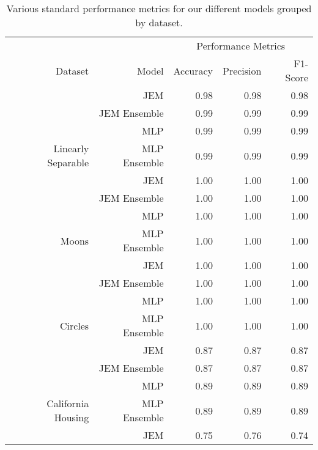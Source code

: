 \begin{table}

\caption{Various standard performance metrics for our different models grouped by dataset. \label{tab:perf} \newline}
\centering
\fontsize{8}{10}\selectfont
\begin{tabular}[t]{rrrrr}
\toprule
\multicolumn{2}{c}{ } & \multicolumn{3}{c}{Performance Metrics} \\
\cmidrule(l{3pt}r{3pt}){3-5}
Dataset & Model & Accuracy & Precision & F1-Score\\
\midrule
 & JEM & 0.98 & 0.98 & 0.98\\

 & JEM Ensemble & 0.99 & 0.99 & 0.99\\

 & MLP & 0.99 & 0.99 & 0.99\\

\multirow[t]{-4}{*}{\raggedleft\arraybackslash Linearly Separable} & MLP Ensemble & 0.99 & 0.99 & 0.99\\
\cmidrule{1-5}
 & JEM & 1.00 & 1.00 & 1.00\\

 & JEM Ensemble & 1.00 & 1.00 & 1.00\\

 & MLP & 1.00 & 1.00 & 1.00\\

\multirow[t]{-4}{*}{\raggedleft\arraybackslash Moons} & MLP Ensemble & 1.00 & 1.00 & 1.00\\
\cmidrule{1-5}
 & JEM & 1.00 & 1.00 & 1.00\\

 & JEM Ensemble & 1.00 & 1.00 & 1.00\\

 & MLP & 1.00 & 1.00 & 1.00\\

\multirow[t]{-4}{*}{\raggedleft\arraybackslash Circles} & MLP Ensemble & 1.00 & 1.00 & 1.00\\
\cmidrule{1-5}
 & JEM & 0.87 & 0.87 & 0.87\\

 & JEM Ensemble & 0.87 & 0.87 & 0.87\\

 & MLP & 0.89 & 0.89 & 0.89\\

\multirow[t]{-4}{*}{\raggedleft\arraybackslash California Housing} & MLP Ensemble & 0.89 & 0.89 & 0.89\\
\cmidrule{1-5}
 & JEM & 0.75 & 0.76 & 0.74\\


\end{tabular}
\end{table}
